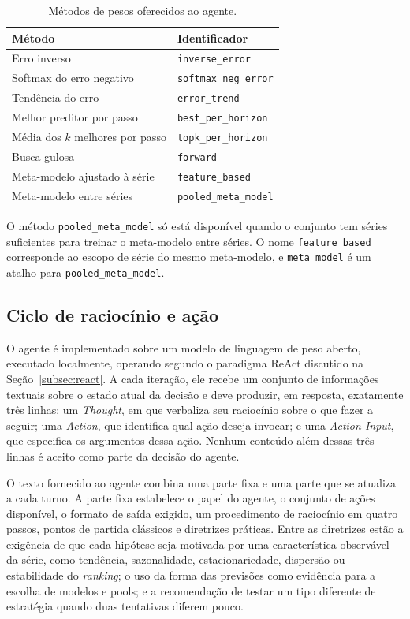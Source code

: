 \begin{table}[H]
\small
\centering
\caption{Métodos de pesos oferecidos ao agente.}
\label{tab:metodos_pesos}
\begin{tabular}{@{}p{7.0cm}p{7.0cm}@{}}
\toprule
\textbf{Método} & \textbf{Identificador} \\
\midrule
Erro inverso & \texttt{inverse\_error} \\
Softmax do erro negativo & \texttt{softmax\_neg\_error} \\
Tendência do erro & \texttt{error\_trend} \\
Melhor preditor por passo & \texttt{best\_per\_horizon} \\
Média dos $k$ melhores por passo & \texttt{topk\_per\_horizon} \\
Busca gulosa & \texttt{forward} \\
Meta-modelo ajustado à série & \texttt{feature\_based} \\
Meta-modelo entre séries & \texttt{pooled\_meta\_model} \\
\bottomrule
\end{tabular}
\end{table}

O método \texttt{pooled\_meta\_model} só está disponível quando o conjunto tem séries suficientes para treinar o meta-modelo entre séries. O nome \texttt{feature\_based} corresponde ao escopo de série do mesmo meta-modelo, e \texttt{meta\_model} é um atalho para \texttt{pooled\_meta\_model}.

\subsection{Ciclo de raciocínio e ação}

O agente é implementado sobre um modelo de linguagem de peso aberto, executado localmente, operando segundo o paradigma ReAct discutido na Seção~\ref{subsec:react}. A cada iteração, ele recebe um conjunto de informações textuais sobre o estado atual da decisão e deve produzir, em resposta, exatamente três linhas: um \textit{Thought}, em que verbaliza seu raciocínio sobre o que fazer a seguir; uma \textit{Action}, que identifica qual ação deseja invocar; e uma \textit{Action Input}, que especifica os argumentos dessa ação. Nenhum conteúdo além dessas três linhas é aceito como parte da decisão do agente.

O texto fornecido ao agente combina uma parte fixa e uma parte que se atualiza a cada turno. A parte fixa estabelece o papel do agente, o conjunto de ações disponível, o formato de saída exigido, um procedimento de raciocínio em quatro passos, pontos de partida clássicos e diretrizes práticas. Entre as diretrizes estão a exigência de que cada hipótese seja motivada por uma característica observável da série, como tendência, sazonalidade, estacionariedade, dispersão ou estabilidade do \textit{ranking}; o uso da forma das previsões como evidência para a escolha de modelos e pools; e a recomendação de testar um tipo diferente de estratégia quando duas tentativas diferem pouco.

